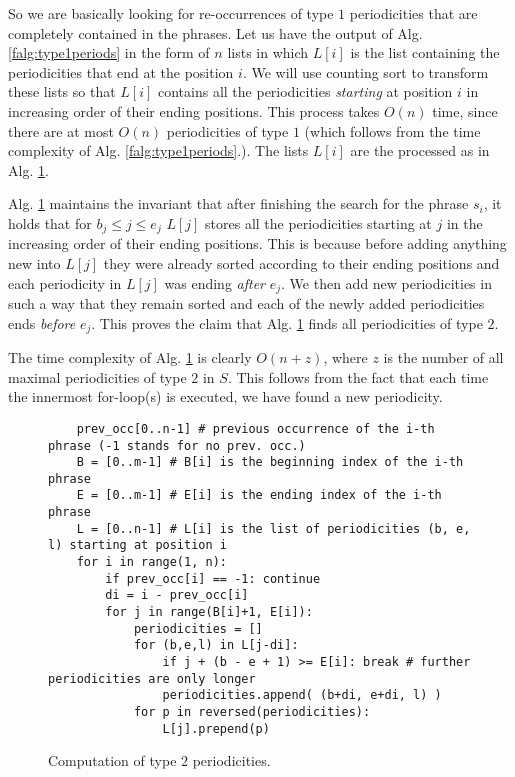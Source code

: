 So we are basically looking for re-occurrences of type $1$ periodicities that are completely contained in the phrases.
Let us have the output of Alg. \ref{falg:type1periods} in the form of $n$ lists in which $L[i]$ is the list containing the periodicities that end at the position $i$.
We will use counting sort to transform these lists so that $L[i]$ contains all the periodicities \textit{starting} at position $i$ in increasing order of their ending positions.
This process takes $O(n)$ time, since there are at most $O(n)$ periodicities of type $1$ (which follows from the time complexity of Alg. \ref{falg:type1periods}.).
The lists $L[i]$ are the processed as in Alg. \ref{alg:type2periodicities}.

Alg. \ref{alg:type2periodicities} maintains the invariant that after finishing the search for the phrase $s_i$, it holds that for $b_j \leq j \leq e_j$ $L[j]$ stores all the periodicities starting at $j$ in the increasing order of their ending positions.
This is because before adding anything new into $L[j]$ they were already sorted according to their ending positions and each periodicity in $L[j]$ was ending \textit{after} $e_j$.
We then add new periodicities in such a way that they remain sorted and each of the newly added periodicities ends \textit{before} $e_j$.
This proves the claim that Alg. \ref{alg:type2periodicities} finds all periodicities of type $2$.

The time complexity of Alg. \ref{alg:type2periodicities} is clearly $O(n+z)$, where $z$ is the number of all maximal periodicities of type $2$ in $S$.
This follows from the fact that each time the innermost for-loop(s) is executed, we have found a new periodicity.

\begin{figure}[!ht]
    \centering
    \begin{verbatim}
    prev_occ[0..n-1] # previous occurrence of the i-th phrase (-1 stands for no prev. occ.)
    B = [0..m-1] # B[i] is the beginning index of the i-th phrase
    E = [0..m-1] # E[i] is the ending index of the i-th phrase
    L = [0..n-1] # L[i] is the list of periodicities (b, e, l) starting at position i
    for i in range(1, n):
        if prev_occ[i] == -1: continue
        di = i - prev_occ[i]
        for j in range(B[i]+1, E[i]):
            periodicities = []
            for (b,e,l) in L[j-di]:
                if j + (b - e + 1) >= E[i]: break # further periodicities are only longer
                periodicities.append( (b+di, e+di, l) )
            for p in reversed(periodicities):
                L[j].prepend(p)
    \end{verbatim}
    \caption{Computation of type $2$ periodicities.}
    \label{alg:type2periodicities}
\end{figure}

